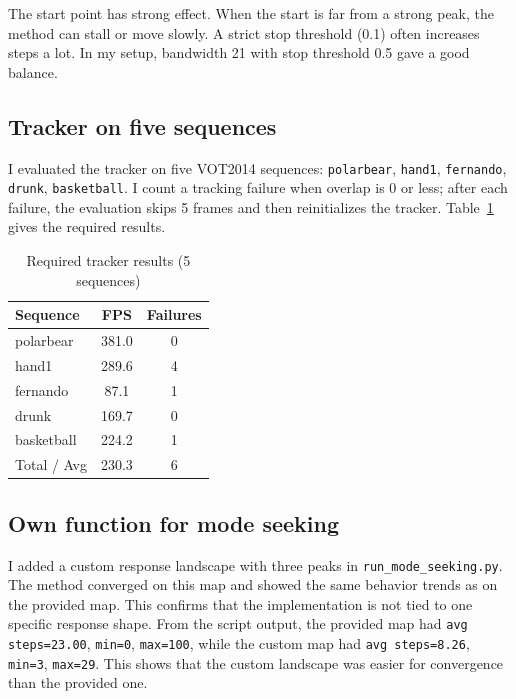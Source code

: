 \documentclass[9pt]{IEEEtran}
\begin{document}
The start point has strong effect.
When the start is far from a strong peak, the method can stall or move slowly.
A strict stop threshold (0.1) often increases steps a lot.
In my setup, bandwidth 21 with stop threshold 0.5 gave a good balance.

\subsection{Tracker on five sequences}
I evaluated the tracker on five VOT2014 sequences: \texttt{polarbear}, \texttt{hand1}, \texttt{fernando}, \texttt{drunk}, \texttt{basketball}.
I count a tracking failure when overlap is 0 or less; after each failure, the evaluation skips 5 frames and then reinitializes the tracker.
Table~\ref{tab:required_tracker} gives the required results.

\begin{table}[h]
    \centering
    \caption{Required tracker results (5 sequences)}
    \label{tab:required_tracker}
    \begin{tabular}{lcc}
        \toprule
        Sequence    & FPS   & Failures \\
        \midrule
        polarbear   & 381.0 & 0        \\
        hand1       & 289.6 & 4        \\
        fernando    & 87.1  & 1        \\
        drunk       & 169.7 & 0        \\
        basketball  & 224.2 & 1        \\
        \midrule
        Total / Avg & 230.3 & 6        \\
        \bottomrule
    \end{tabular}
\end{table}

\subsection{Own function for mode seeking}
I added a custom response landscape with three peaks in \texttt{run\_mode\_seeking.py}.
The method converged on this map and showed the same behavior trends as on the provided map.
This confirms that the implementation is not tied to one specific response shape.
From the script output, the provided map had \texttt{avg steps=23.00}, \texttt{min=0}, \texttt{max=100}, while the custom map had \texttt{avg steps=8.26}, \texttt{min=3}, \texttt{max=29}.
This shows that the custom landscape was easier for convergence than the provided one.
\end{document}
